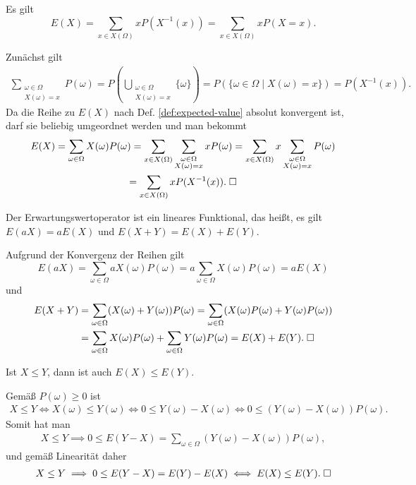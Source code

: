 \begin{Satz} Es gilt
\[E(X) = \sum_{x\in X(\Omega)} xP(X^{-1}(x))
= \sum_{x\in X(\Omega)} xP(X=x).\]
\end{Satz}
 Zunächst gilt
\begin{gather*}
\sum_{\substack{\omega\in\Omega\\ X(\omega)=x}}P(\omega)
= P(\bigcup_{\substack{\omega\in\Omega\\ X(\omega)=x}} \{\omega\})
= P(\{\omega\in\Omega\mid X(\omega)=x\})
= P(X^{-1}(x)).
\end{gather*}
Da die Reihe zu $E(X)$ nach Def. \ref{def:expected-value}
absolut konvergent ist, darf sie beliebig umgeordnet werden und
man bekommt
\begin{gather*}
E(X) = \sum_{\omega\in\Omega}X(\omega)P(\omega)
= \sum_{x\in X(\Omega)}\sum_{\substack{\omega\in\Omega\\ X(\omega)=x}} xP(\omega)
= \sum_{x\in X(\Omega)} x\sum_{\substack{\omega\in\Omega\\ X(\omega)=x}}P(\omega)\\
= \sum_{x\in X(\Omega)} xP(X^{-1}(x)).\;\square
\end{gather*}

\newpage
\begin{Korollar}\label{expected-value-op-linear}
Der Erwartungswertoperator ist ein lineares Funktional,
das heißt, es gilt $E(aX)=aE(X)$ und $E(X+Y)=E(X)+E(Y)$. 
\end{Korollar}
 Aufgrund der Konvergenz der Reihen gilt
\[E(aX) = \sum_{\omega\in\Omega}aX(\omega)P(\omega)
= a\sum_{\omega\in\Omega}X(\omega)P(\omega) = aE(X)\]
und
\begin{align*}
E(X+Y) &= \sum_{\omega\in\Omega} (X(\omega)+Y(\omega))P(\omega)
= \sum_{\omega\in\Omega} (X(\omega)P(\omega)+Y(\omega)P(\omega))\\
&= \sum_{\omega\in\Omega} X(\omega)P(\omega)
+ \sum_{\omega\in\Omega} Y(\omega)P(\omega) = E(X)+E(Y).\;\square
\end{align*}

\begin{Korollar} Ist $X\le Y$, dann ist auch $E(X)\le E(Y)$.
\end{Korollar}
 Gemäß $P(\omega)\ge 0$ ist
\begin{gather*}
X\le Y\iff X(\omega)\le Y(\omega)\iff 0\le Y(\omega)-X(\omega)
\iff 0\le (Y(\omega)-X(\omega))P(\omega).
\end{gather*}
Somit hat man
\begin{gather*}
X\le Y\implies 0\le E(Y-X) = \sum_{\omega\in\Omega} (Y(\omega)-X(\omega))P(\omega),
\end{gather*}
und gemäß Linearität daher
\begin{gather*}
X\le Y\implies 0\le E(Y-X) = E(Y)-E(X) \iff E(X)\le E(Y).\;\square
\end{gather*}

